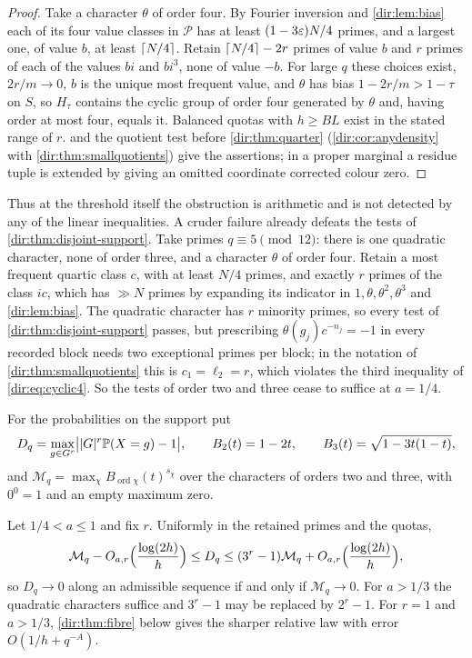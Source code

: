 \begin{proof}
Take a character $\theta$ of order four. By Fourier inversion and \cref{dir:lem:bias} each of its four value
classes in $\mathcal P$ has at least $(1-3\varepsilon)N/4$ primes, and a largest one, of value $b$, at least
$\lceil N/4\rceil$. Retain $\lceil N/4\rceil-2r$ primes of value $b$ and $r$ primes of each of the values $bi$ and $bi^3$,
none of value $-b$. For large $q$ these choices exist, $2r/m\to0$, $b$ is the unique most frequent value, and
$\theta$ has bias $1-2r/m>1-\tau$ on $S$, so $H_\tau$ contains the cyclic group of order four generated by
$\theta$ and, having order at most four, equals it. Balanced quotas with $h\ge BL$ exist in the stated range of
$r$.  and the quotient test before \cref{dir:thm:quarter} (\cref{dir:cor:anydensity} with
\cref{dir:thm:smallquotients}) give the assertions; in a proper marginal a residue tuple is
extended by giving an omitted coordinate corrected colour zero.
\end{proof}

Thus at the threshold itself the obstruction is arithmetic and is not detected by any of the linear
inequalities. A cruder failure already defeats the tests of \cref{dir:thm:disjoint-support}. Take primes
$q\equiv5\pmod{12}$: there is one quadratic character, none of order three, and a character $\theta$ of order
four. Retain a most frequent quartic class $c$, with at least $N/4$ primes, and exactly $r$ primes of the class
$ic$, which has $\gg N$ primes by expanding its indicator in $1,\theta,\theta^2,\theta^3$ and \cref{dir:lem:bias}.
The quadratic character has $r$ minority primes, so every test of \cref{dir:thm:disjoint-support} passes, but
prescribing $\theta(g_j)c^{-n_j}=-1$ in every recorded block needs two exceptional primes per block; in the
notation of \cref{dir:thm:smallquotients} this is $c_1=\ell_2=r$, which violates the third inequality of
\eqref{dir:eq:cyclic4}. So the tests of order two and three cease to suffice at $a=1/4$.

For the probabilities on the support put
\[
 D_q=\max_{g\in G^r}\bigl\lvert\lvert G\rvert^r\mathbb{P}(X=g)-1\bigr\rvert,\qquad B_2(t)=1-2t,\qquad B_3(t)=\sqrt{1-3t(1-t)},
\]
and $\mathcal M_q=\max_\chi B_{\operatorname{ord}\chi}(t)^{s_\chi}$ over the characters of orders two and
three, with $0^0=1$ and an empty maximum zero.

\begin{theorem}\label{dir:thm:disjoint-mixing}
Let $1/4<a\le1$ and fix $r$. Uniformly in the retained primes and the quotas,
\[
 \mathcal M_q-O_{a,r}\Bigl(\frac{\log(2h)}h\Bigr)\le D_q\le(3^r-1)\mathcal M_q+O_{a,r}\Bigl(\frac{\log(2h)}h\Bigr),
\]
so $D_q\to0$ along an admissible sequence if and only if $\mathcal M_q\to0$. For $a>1/3$ the quadratic
characters suffice and $3^r-1$ may be replaced by $2^r-1$. For $r=1$ and $a>1/3$, \cref{dir:thm:fibre}
below gives the sharper relative law with error $O(1/h+q^{-A})$.
\end{theorem}

